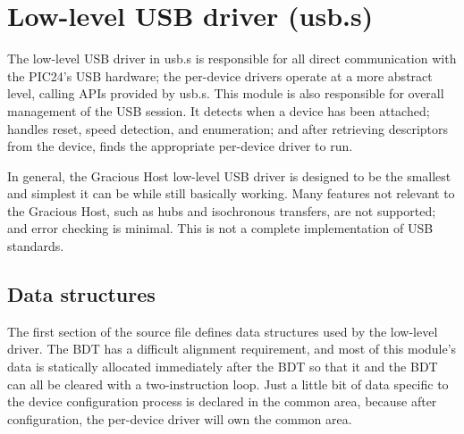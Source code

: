 
%
%
%
%
%
%

\chapter{Low-level USB driver (usb.s)}

The low-level USB driver in usb.s is responsible for all direct
communication with the PIC24's USB hardware; the per-device drivers operate
at a more abstract level, calling APIs provided by usb.s.  This module is
also responsible for overall management of the USB session.  It detects when
a device has been attached; handles reset, speed detection, and enumeration;
and after retrieving descriptors from the device, finds the appropriate
per-device driver to run.

In general, the Gracious Host low-level USB driver is designed to be the
smallest and simplest it can be while still basically working.  Many
features not relevant to the Gracious Host, such as hubs and isochronous
transfers, are not supported; and error checking is minimal.  This is not a
complete implementation of USB standards.

\section{Data structures}

The first section of the source file defines data structures used by the
low-level driver.  The BDT has a difficult alignment requirement, and most of
this module's data is statically allocated immediately after the BDT so that
it and the BDT can all be cleared with a two-instruction  loop. 
Just a little bit of data specific to the device configuration process is
declared in the common area, because after configuration, the per-device
driver will own the common area.

